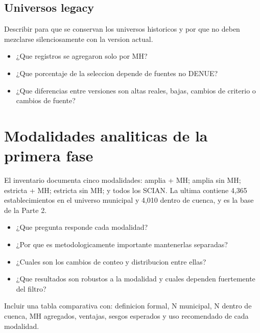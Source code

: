 \documentclass[11pt,letterpaper]{article}
\begin{document}
\subsection{Universos legacy}
Describir para que se conservan los universos historicos y por que no deben mezclarse silenciosamente con la version actual.

\begin{preguntas}
\begin{itemize}
    \item ¿Que registros se agregaron solo por MH?
    \item ¿Que porcentaje de la seleccion depende de fuentes no DENUE?
    \item ¿Que diferencias entre versiones son altas reales, bajas, cambios de criterio o cambios de fuente?
\end{itemize}
\end{preguntas}

\section{Modalidades analiticas de la primera fase}

\begin{hechos}
El inventario documenta cinco modalidades: amplia + MH; amplia sin MH; estricta + MH; estricta sin MH; y todos los SCIAN. La ultima contiene 4,365 establecimientos en el universo municipal y 4,010 dentro de cuenca, y es la base de la Parte 2.
\end{hechos}

\begin{preguntas}
\begin{itemize}
    \item ¿Que pregunta responde cada modalidad?
    \item ¿Por que es metodologicamente importante mantenerlas separadas?
    \item ¿Cuales son los cambios de conteo y distribucion entre ellas?
    \item ¿Que resultados son robustos a la modalidad y cuales dependen fuertemente del filtro?
\end{itemize}
\end{preguntas}

\begin{evidencia}
Incluir una tabla comparativa con: definicion formal, N municipal, N dentro de cuenca, MH agregados, ventajas, sesgos esperados y uso recomendado de cada modalidad.
\end{evidencia}
\end{document}
